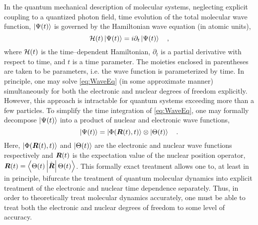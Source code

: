 In the quantum mechanical description of molecular systems, neglecting explicit
coupling to a quantized photon field, time evolution of the total molecular wave
function, $\left\vert \Psi (t) \right\rangle$ is governed by the Hamiltonian wave equation 
(in atomic units),
\begin{equation}
\mathcal{H}(t) \left\vert \Psi (t) \right\rangle = i\partial_t \left\vert \Psi(t) \right\rangle \quad,
\label{eq:WaveEq}
\end{equation}
where $\mathcal{H}(t)$ is the time--dependent Hamiltonian, $\partial_t$ is a partial
derivative with respect to time, and $t$ is a time parameter.  The moieties
enclosed in parentheses are taken to be parameters, i.e. the wave function is
parameterized by time.  In principle, one may solve \cref{eq:WaveEq} (in some
approximate manner) simultaneously for both the electronic and nuclear degrees
of freedom explicitly. However, this approach is  intractable for quantum
systems exceeding more than a few particles. To simplify the time integration
of \cref{eq:WaveEq}, one may formally decompose $\left\vert \Psi (t) \right\rangle$ into a product
of nuclear and electronic wave functions,
\begin{equation} 
\left\vert \Psi (t) \right\rangle = \left\vert \Phi(\boldsymbol{R}(t),t) \right\rangle\otimes\left\vert \Theta(t) \right\rangle 
\quad .  
\label{eq:exactSepElecNuc}
\end{equation} 
Here, $\left\vert \Phi(\boldsymbol{R}(t),t) \right\rangle$ and $\left\vert \Theta (t) \right\rangle$ are the electronic and
nuclear wave functions respectively and $\boldsymbol{R}(t)$ is the expectation value of
the nuclear position operator, $\boldsymbol{R}(t) =
\left\langle \Theta(t) \left\vert \hat{\boldsymbol{R}} \right\vert \Theta(t) \right\rangle$.  
This formally exact treatment\cite{Gross10_PRL123002, Cederbaum08_JCP124101,
Ghosh15_MP1} allows one to, at least in in principle, bifurcate the treatment of
quantum molecular dynamics into explicit treatment of the electronic and nuclear
time dependence separately.  Thus, in order to theoretically treat molecular
dynamics accurately, one must be able to treat both the electronic and nuclear
degrees of freedom to some level of accuracy.

